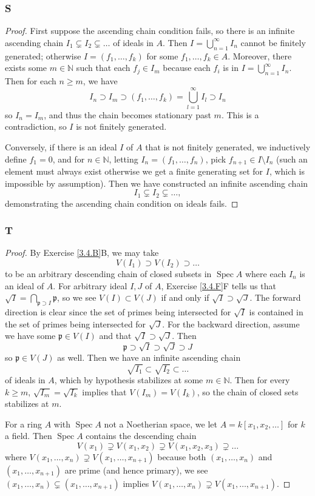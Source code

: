 \documentclass{article}
\newcommand{\N}{\mathbb{N}}
\newcommand{\frkp}{\mathfrak{p}}
\DeclareMathOperator{\Spec}{\mathrm{Spec}}
\begin{document}
\subsubsection{S}\label{3.6.S}
\begin{proof}
    First suppose the ascending chain condition fails, so there is an infinite ascending chain $I_1 \subsetneq I_2 \subsetneq \dots$ of ideals in $A$. Then $I=\bigcup_{n=1}^\infty I_n$ cannot be finitely generated; otherwise $I = (f_1, \dots, f_k)$ for some $f_1,\dots, f_k\in A$. Moreover, there exists some $m\in \N$ such that each $f_j \in I_m$ because each $f_i$ is in $I=\bigcup_{n=1}^\infty I_n$. Then for each $n\ge m$, we have $$I_n\supset I_m \supset (f_1,\dots,f_k)=\bigcup_{l=1}^\infty I_l \supset I_n$$ so $I_n=I_m$, and thus the chain becomes stationary past $m$. This is a contradiction, so $I$ is not finitely generated.

    

    Conversely, if there is an ideal $I$ of $A$ that is not finitely generated, we inductively define $f_1=0$, and for $n\in \N$, letting $I_n=(f_1,\dots, f_n)$, pick $f_{n+1} \in I\setminus I_n$ (such an element must always exist otherwise we get a finite generating set for $I$, which is impossible by assumption). Then we have constructed an infinite ascending chain $$I_1 \subsetneq I_2 \subsetneq \dots,$$ demonstrating the ascending chain condition on ideals fails.
\end{proof}
\subsubsection{T}\label{3.6.T}
\begin{proof}
    By Exercise \ref{3.4.B}B, we may take
    \[
    V(I_1)\supset V(I_2)\supset \dots
    \]
    to be an arbitrary descending chain of closed subsets in $\Spec A$ where each $I_n$ is an ideal of $A$. For arbitrary ideal $I,J$ of $A$, Exercise \ref{3.4.F}F tells us that $\sqrt{I}=\bigcap_{\frkp \supset I} \frkp$, so we see $V(I)\subset V(J)$ if and only if $\sqrt{I}\supset \sqrt{J}$. The forward direction is clear since the set of primes being intersected for $\sqrt{I}$ is contained in the set of primes being intersected for $\sqrt{J}$. For the backward direction, assume we have some $\frkp\in V(I)$ and that $\sqrt{I}\supset \sqrt{J}$. Then
    \[
    \frkp \supset \sqrt{I}\supset \sqrt{J} \supset J
    \]
    so $\frkp \in V(J)$ as well. Then we have an infinite ascending chain 
    \[
    \sqrt{I_1}\subset \sqrt{I_2}\subset \dots
    \]
    of ideals in $A$, which by hypothesis stabilizes at some $m\in \N$. Then for every $k\ge m$, $\sqrt{I_m}=\sqrt{I_k}$ implies that $V(I_m)=V(I_k)$, so the chain of closed sets stabilizes at $m$.

    For a ring $A$ with $\Spec A$ not a Noetherian space, we let $A=k[x_1,x_2,\dots]$ for $k$ a field. Then $\Spec A$ contains the descending chain
    \[
    V(x_1)\supsetneq V(x_1,x_2)\supsetneq V(x_1,x_2,x_3)\supsetneq \dots
    \]
    where $V(x_1,\dots,x_n)\supsetneq V(x_1,\dots, x_{n+1})$ because both $(x_1,\dots, x_n)$ and $(x_1,\dots, x_{n+1})$ are prime (and hence primary), we see $(x_1,\dots, x_n)\subsetneq  (x_1, \dots, x_{n+1})$ implies $V(x_1, \dots, x_n) \supsetneq V(x_1, \dots, x_{n+1})$.
\end{proof}
\end{document}

